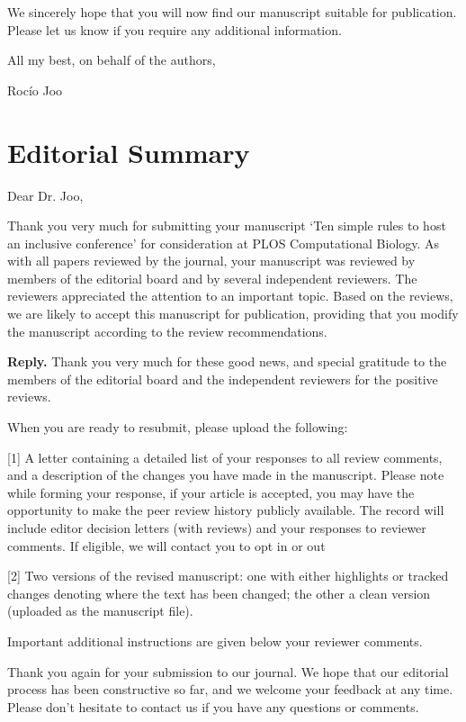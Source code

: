 \documentclass{article}
\newenvironment{Reply}{\noindent\color{BlueViolet}\textbf{Reply.}}{\vspace{1em}}
\begin{document}
We sincerely hope that you will now find our manuscript suitable for publication. Please let us know if you require any additional information. 

All my best,
on behalf of the authors,

Roc\'io Joo


\section*{Editorial Summary} 

Dear Dr. Joo,

Thank you very much for submitting your manuscript `Ten simple rules to host an inclusive conference' for consideration at PLOS Computational Biology. As with all papers reviewed by the journal, your manuscript was reviewed by members of the editorial board and by several independent reviewers. The reviewers appreciated the attention to an important topic. Based on the reviews, we are likely to accept this manuscript for publication, providing that you modify the manuscript according to the review recommendations.

\begin{Reply}
    Thank you very much for these good news, and special gratitude to the members of the editorial board and the independent reviewers for the positive reviews.
\end{Reply}

When you are ready to resubmit, please upload the following:

[1] A letter containing a detailed list of your responses to all review comments, and a description of the changes you have made in the manuscript. Please note while forming your response, if your article is accepted, you may have the opportunity to make the peer review history publicly available. The record will include editor decision letters (with reviews) and your responses to reviewer comments. If eligible, we will contact you to opt in or out

[2] Two versions of the revised manuscript: one with either highlights or tracked changes denoting where the text has been changed; the other a clean version (uploaded as the manuscript file).

Important additional instructions are given below your reviewer comments.

 Thank you again for your submission to our journal. We hope that our editorial process has been constructive so far, and we welcome your feedback at any time. Please don't hesitate to contact us if you have any questions or comments.
\end{document}
